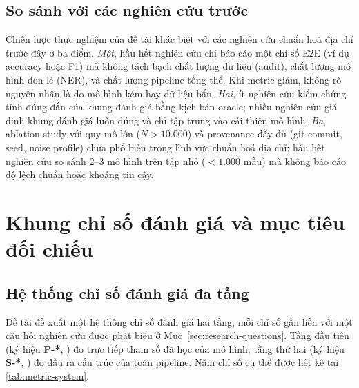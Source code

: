 \subsection{So sánh với các nghiên cứu trước}
\label{sec:exp-strategy-comparison}

Chiến lược thực nghiệm của đề tài khác biệt với các nghiên cứu chuẩn hoá địa chỉ trước đây ở ba điểm. \emph{Một}, hầu hết nghiên cứu chỉ báo cáo một chỉ số E2E (ví dụ accuracy hoặc F1) mà không tách bạch chất lượng dữ liệu (audit), chất lượng mô hình đơn lẻ (NER), và chất lượng pipeline tổng thể. Khi metric giảm, không rõ nguyên nhân là do mô hình kém hay dữ liệu bẩn. \emph{Hai}, ít nghiên cứu kiểm chứng tính đúng đắn của khung đánh giá bằng kịch bản oracle; nhiều nghiên cứu giả định khung đánh giá luôn đúng và chỉ tập trung vào cải thiện mô hình. \emph{Ba}, ablation study với quy mô lớn (\(N > 10.000\)) và provenance đầy đủ (git commit, seed, noise profile) chưa phổ biến trong lĩnh vực chuẩn hoá địa chỉ; hầu hết nghiên cứu so sánh 2--3 mô hình trên tập nhỏ (\(< 1.000\) mẫu) mà không báo cáo độ lệch chuẩn hoặc khoảng tin cậy.

\section{Khung chỉ số đánh giá và mục tiêu đối chiếu}
\label{sec:exp-metrics}

\subsection{Hệ thống chỉ số đánh giá đa tầng}
\label{sec:exp-metrics-system}

Đề tài đề xuất một hệ thống chỉ số đánh giá hai tầng, mỗi chỉ số gắn liền với một câu hỏi nghiên cứu được phát biểu ở Mục~\ref{sec:research-questions}. Tầng đầu tiên (ký hiệu \textbf{P-*}, ) đo trực tiếp tham số đã học của mô hình; tầng thứ hai (ký hiệu \textbf{S-*}, ) đo đầu ra cấu trúc của toàn pipeline. Năm chỉ số cụ thể được liệt kê tại \cref{tab:metric-system}.

